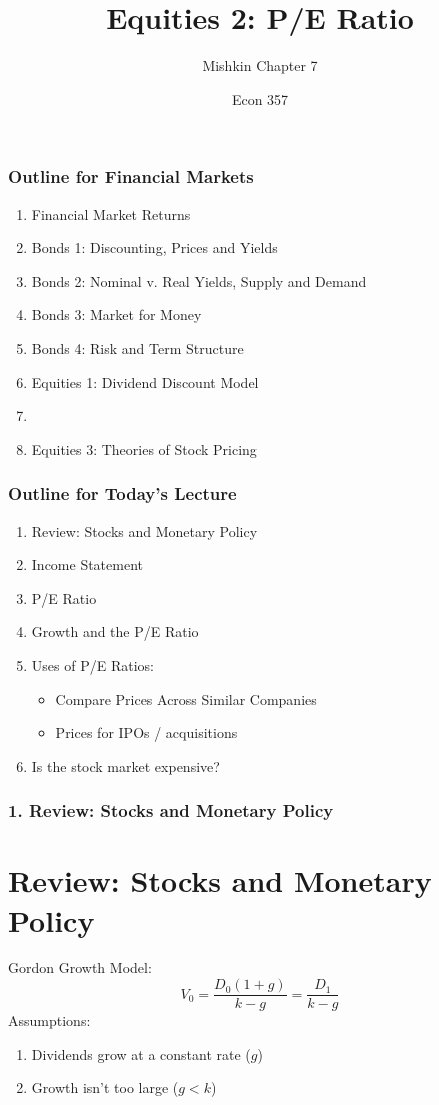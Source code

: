 \documentclass{beamer}
\title{Equities 2: P/E Ratio}
\subtitle{Mishkin Chapter 7}
\author{Econ 357}
\date{\week}
\begin{document}
\frame{\titlepage}

\begin{frame}
    \frametitle{Outline for Financial Markets}
        \begin{enumerate}
            \item Financial Market Returns
            \item Bonds 1: Discounting, Prices and Yields
            \item Bonds 2: Nominal v. Real Yields, Supply and Demand
            \item Bonds 3: Market for Money
            \item Bonds 4: Risk and Term Structure
            \item Equities 1: Dividend Discount Model
            \item {}
            \item Equities 3: Theories of Stock Pricing
            
        \end{enumerate}
\end{frame}


\begin{frame}
    \frametitle{Outline for Today's Lecture}
    \begin{enumerate}
        \item Review: Stocks and Monetary Policy
        \item Income Statement
        \item P/E Ratio
        \item Growth and the P/E Ratio
        \item Uses of P/E Ratios:
        \begin{itemize}
            \item Compare Prices Across Similar Companies
            \item Prices for IPOs / acquisitions
        \end{itemize}
        \item Is the stock market expensive?
    \end{enumerate}

\end{frame}

\begin{frame}[t]
    \frametitle{1. Review: Stocks and Monetary Policy}
    \section{Review: Stocks and Monetary Policy}

    Gordon Growth Model:
    $$V_0 = \frac{D_0(1+g)}{k-g} = \frac{D_1}{k-g}$$
    Assumptions:
    \begin{enumerate}
        \item Dividends grow at a constant rate ($g$)
        \item Growth isn't too large ($g<k$)
    \end{enumerate}

    \vspace{2em}

\end{frame}
\end{document}
